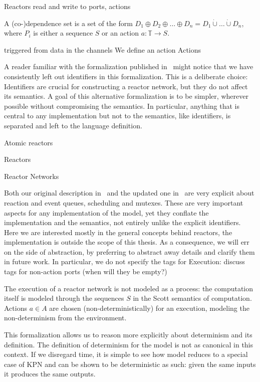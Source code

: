 \begin{defn}
\begin{defn}
Reactors read and write to ports, actions  
\begin{defn}[(co)-dependences]
A (co-)dependence set is a set of the form $D_1 \oplus D_2 \oplus \ldots \oplus D_n = D_1 \dot{\cup} \ldots \dot{\cup} D_n$, where $P_i$ is either a sequence $S$ or an action $a : \mathbb{T} \rightarrow S$.
\end{defn}
triggered from data in the channels We define an action
Actions

A reader familiar with the formalization published in~\cite{lohstroh_cyphy19} might notice that we have consistently left out identifiers in this formalization.
This is a deliberate choice: Identifiers are crucial for constructing a reactor network, but they do not affect its semantics. 
A goal of this alternative formalization is to be simpler, wherever possible without compromising the semantics.
In particular, anything that is central to any implementation but not to the semantics, like identifiers, is separated and left to the language definition.

Atomic reactors

Reactors

Reactor Networks

Both our original description in~\cite{lohstroph_cyphy19} and the updated one in~\cite{lohstroh_phdthesis} are very explicit about reaction and event queues, scheduling and mutexes.
These are very important aspects for any implementation of the model, yet they conflate the implementation and the semantics, not entirely unlike the explicit identifiers.
Here we are interested mostly in the general concepts behind reactors, the implementation is outside the scope of this thesis.
As a consequence, we will err on the side of abstraction, by preferring to abstract away details and clarify them in future work. 
In particular, we do not specify the tags for 
Execution: discuss tags for non-action ports (when will they be empty?)

The execution of a reactor network is not modeled as a process: the computation itself is modeled through the sequences $S$ in the Scott semantics of computation.
Actions $a \in A$ are chosen (non-deterministically) for an execution, modeling the non-determinism from the environment.

This formalization allows us to reason more explicitly about determinism and its definition.
The definition of determinism for the model is not as canonical in this context.
If we disregard time, it is simple to see how model reduces to a special case of \ac{KPN} and can be shown to be deterministic as such: 
given the same inputs it produces the same outputs.


\end{defn}
\end{defn}
